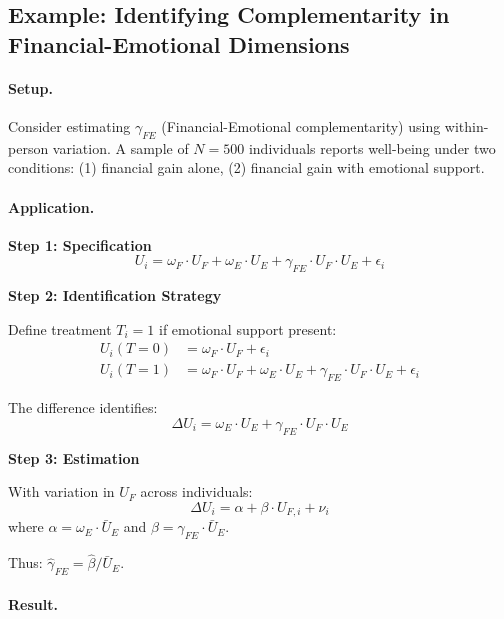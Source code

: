 \subsection{Example: Identifying Complementarity in Financial-Emotional Dimensions}

\paragraph{Setup.}
Consider estimating $\gamma_{FE}$ (Financial-Emotional complementarity) using
within-person variation. A sample of $N = 500$ individuals reports well-being
under two conditions: (1) financial gain alone, (2) financial gain with emotional
support.

\paragraph{Application.}

\textbf{Step 1: Specification}
\begin{equation}
U_i = \omega_F \cdot U_F + \omega_E \cdot U_E + \gamma_{FE} \cdot U_F \cdot U_E + \epsilon_i
\end{equation}

\textbf{Step 2: Identification Strategy}

Define treatment $T_i = 1$ if emotional support present:
\begin{align}
U_i(T=0) &= \omega_F \cdot U_F + \epsilon_i \\
U_i(T=1) &= \omega_F \cdot U_F + \omega_E \cdot U_E + \gamma_{FE} \cdot U_F \cdot U_E + \epsilon_i
\end{align}

The difference identifies:
\begin{equation}
\Delta U_i = \omega_E \cdot U_E + \gamma_{FE} \cdot U_F \cdot U_E
\end{equation}

\textbf{Step 3: Estimation}

With variation in $U_F$ across individuals:
\begin{equation}
\Delta U_i = \alpha + \beta \cdot U_{F,i} + \nu_i
\end{equation}
where $\alpha = \omega_E \cdot \bar{U}_E$ and $\beta = \gamma_{FE} \cdot \bar{U}_E$.

Thus: $\hat{\gamma}_{FE} = \hat{\beta} / \bar{U}_E$.

\paragraph{Result.}

